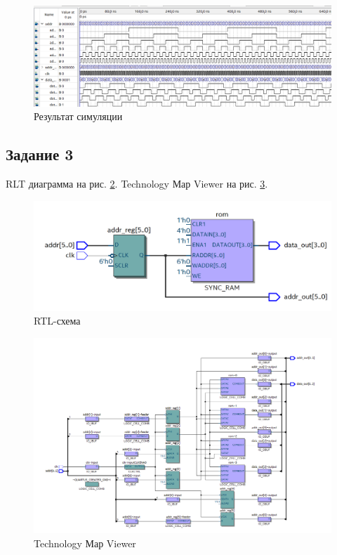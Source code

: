 \documentclass[a4paper,14pt]{article}
\begin{document}
	\begin{figure}[H]
		\centering
		\includegraphics[width=\linewidth]{images/z2_sim}
		\caption{Результат симуляции}
		\label{fig:z2_sim}
	\end{figure}

	\subsection{Задание 3}
	
	RLT диаграмма на рис. \ref{fig:z3_rtl}. Technology Мар Viewer на рис. \ref{fig:z3_tmv}.
	
	\begin{figure}[H]
		\centering
		\includegraphics[width=0.8\linewidth]{images/z3_rtl}
		\caption{RTL-схема}
		\label{fig:z3_rtl}
	\end{figure}
	
	\begin{figure}[H]
		\centering
		\includegraphics[width=\linewidth]{images/z3_tmv}
		\caption{Technology Мар Viewer}
		\label{fig:z3_tmv}
	\end{figure}
	
\end{document}
